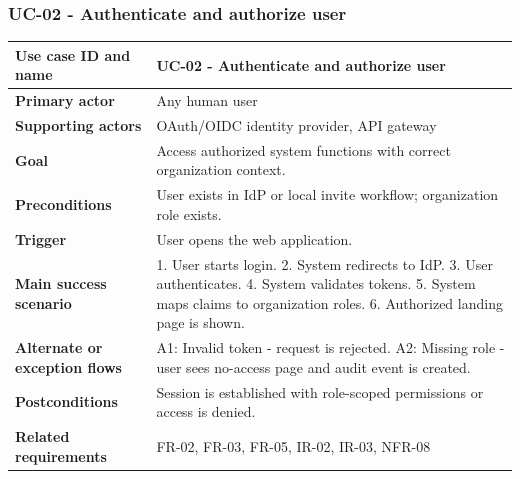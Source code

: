\documentclass[11pt,a4paper]{article}
\begin{document}
\subsubsection{UC-02 - Authenticate and authorize user}
\begin{footnotesize}
\begin{longtable}{@{}p{}p{}@{}}
\rowcolor{gray!10}\textbf{Use case ID and name} & UC-02 - Authenticate and authorize user \\ \hline
\rowcolor{gray!10}\textbf{Primary actor} & Any human user \\ \hline
\rowcolor{gray!10}\textbf{Supporting actors} & OAuth/OIDC identity provider, API gateway \\ \hline
\rowcolor{gray!10}\textbf{Goal} & Access authorized system functions with correct organization context. \\ \hline
\rowcolor{gray!10}\textbf{Preconditions} & User exists in IdP or local invite workflow; organization role exists. \\ \hline
\rowcolor{gray!10}\textbf{Trigger} & User opens the web application. \\ \hline
\rowcolor{gray!10}\textbf{Main success scenario} & 1. User starts login. 2. System redirects to IdP. 3. User authenticates. 4. System validates tokens. 5. System maps claims to organization roles. 6. Authorized landing page is shown. \\ \hline
\rowcolor{gray!10}\textbf{Alternate or exception flows} & A1: Invalid token - request is rejected. A2: Missing role - user sees no-access page and audit event is created. \\ \hline
\rowcolor{gray!10}\textbf{Postconditions} & Session is established with role-scoped permissions or access is denied. \\ \hline
\rowcolor{gray!10}\textbf{Related requirements} & FR-02, FR-03, FR-05, IR-02, IR-03, NFR-08 \\ \hline
\end{longtable}
\end{footnotesize}
\end{document}
